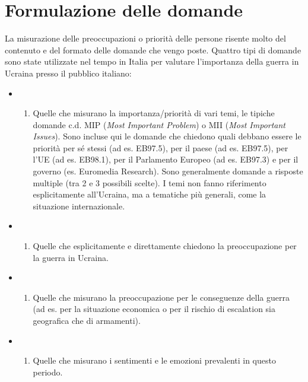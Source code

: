\documentclass[
]{book}
\providecommand{\tightlist}{%
  \setlength{\itemsep}{0pt}\setlength{\parskip}{0pt}}
\begin{document}
\hypertarget{formulazione-delle-domande}{%
\section{Formulazione delle domande}\label{formulazione-delle-domande}}

La misurazione delle preoccupazioni o priorità delle persone risente molto del contenuto e del formato delle domande che vengo poste. Quattro tipi di domande sono state utilizzate nel tempo in Italia per valutare l'importanza della guerra in Ucraina presso il pubblico italiano:

\begin{itemize}
\item
  \begin{enumerate}
  \def\labelenumi{\alph{enumi})}
  \tightlist
  \item
    Quelle che misurano la importanza/priorità di vari temi, le tipiche domande c.d. MIP (\emph{Most Important Problem}) o MII (\emph{Most Important Issues}). Sono incluse qui le domande che chiedono quali debbano essere le priorità per sé stessi (ad es. EB97.5), per il paese (ad es. EB97.5), per l'UE (ad es. EB98.1), per il Parlamento Europeo (ad es. EB97.3) e per il governo (es. Euromedia Research). Sono generalmente domande a risposte multiple (tra 2 e 3 possibili scelte). I temi non fanno riferimento esplicitamente all'Ucraina, ma a tematiche più generali, come la situazione internazionale.
  \end{enumerate}
\item
  \begin{enumerate}
  \def\labelenumi{\alph{enumi})}
  \setcounter{enumi}{1}
  \tightlist
  \item
    Quelle che esplicitamente e direttamente chiedono la preoccupazione per la guerra in Ucraina.
  \end{enumerate}
\item
  \begin{enumerate}
  \def\labelenumi{\alph{enumi})}
  \setcounter{enumi}{2}
  \tightlist
  \item
    Quelle che misurano la preoccupazione per le conseguenze della guerra (ad es. per la situazione economica o per il rischio di escalation sia geografica che di armamenti).
  \end{enumerate}
\item
  \begin{enumerate}
  \def\labelenumi{\alph{enumi})}
  \setcounter{enumi}{3}
  \tightlist
  \item
    Quelle che misurano i sentimenti e le emozioni prevalenti in questo periodo.
  \end{enumerate}
\end{itemize}
\end{document}
